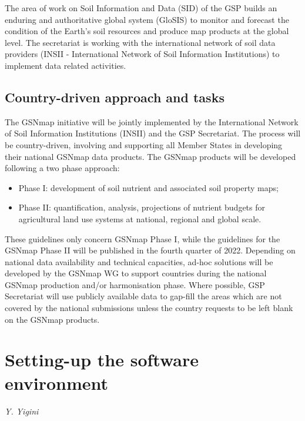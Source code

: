 \documentclass[
  10pt,
  b5paper,
  oneside]{book}
\providecommand{\tightlist}{%
  \setlength{\itemsep}{0pt}\setlength{\parskip}{0pt}}
\begin{document}
The area of work on Soil Information and Data (SID) of the GSP builds an enduring and authoritative global system (GloSIS) to monitor and forecast the condition of the Earth's soil resources and produce map products at the global level. The secretariat is working with the international network of soil data providers (INSII - International Network of Soil Information Institutions) to implement data related activities.

\hypertarget{country-driven-approach-and-tasks}{%
\section{Country-driven approach and tasks}\label{country-driven-approach-and-tasks}}

The GSNmap initiative will be jointly implemented by the International Network of Soil Information Institutions (INSII) and the GSP Secretariat. The process will be country-driven, involving and supporting all Member States in developing their national GSNmap data products. The GSNmap products will be developed following a two phase approach:

\begin{itemize}
\tightlist
\item
  Phase I: development of soil nutrient and associated soil property maps;
\item
  Phase II: quantification, analysis, projections of nutrient budgets for agricultural land use systems at national, regional and global scale.
\end{itemize}

These guidelines only concern GSNmap Phase I, while the guidelines for the GSNmap Phase II will be published in the fourth quarter of 2022.
Depending on national data availability and technical capacities, ad-hoc solutions will be developed by the GSNmap WG to support countries during the national GSNmap production and/or harmonisation phase. Where possible, GSP Secretariat will use publicly available data to gap-fill the areas which are not covered by the national submissions unless the country requests to be left blank on the GSNmap products.

\hypertarget{setting-up-the-software-environment}{%
\chapter{Setting-up the software environment}\label{setting-up-the-software-environment}}

\emph{Y. Yigini}
\end{document}
